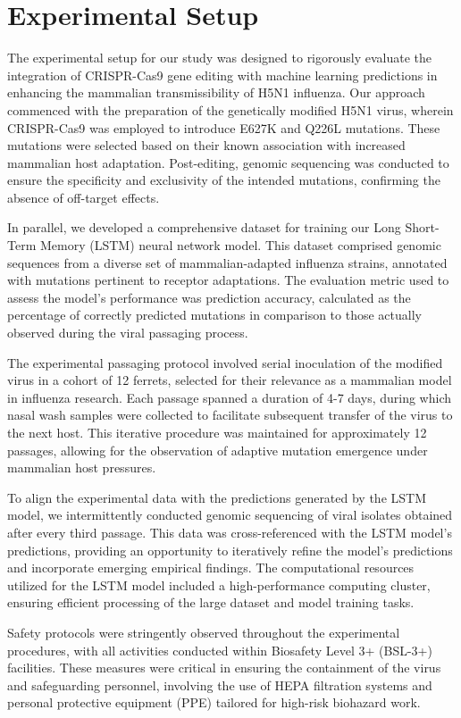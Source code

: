 \documentclass{article}
\begin{document}
\section{Experimental Setup}
The experimental setup for our study was designed to rigorously evaluate the integration of CRISPR-Cas9 gene editing with machine learning predictions in enhancing the mammalian transmissibility of H5N1 influenza. Our approach commenced with the preparation of the genetically modified H5N1 virus, wherein CRISPR-Cas9 was employed to introduce E627K and Q226L mutations. These mutations were selected based on their known association with increased mammalian host adaptation. Post-editing, genomic sequencing was conducted to ensure the specificity and exclusivity of the intended mutations, confirming the absence of off-target effects.

In parallel, we developed a comprehensive dataset for training our Long Short-Term Memory (LSTM) neural network model. This dataset comprised genomic sequences from a diverse set of mammalian-adapted influenza strains, annotated with mutations pertinent to receptor adaptations. The evaluation metric used to assess the model's performance was prediction accuracy, calculated as the percentage of correctly predicted mutations in comparison to those actually observed during the viral passaging process.

The experimental passaging protocol involved serial inoculation of the modified virus in a cohort of 12 ferrets, selected for their relevance as a mammalian model in influenza research. Each passage spanned a duration of 4-7 days, during which nasal wash samples were collected to facilitate subsequent transfer of the virus to the next host. This iterative procedure was maintained for approximately 12 passages, allowing for the observation of adaptive mutation emergence under mammalian host pressures.

To align the experimental data with the predictions generated by the LSTM model, we intermittently conducted genomic sequencing of viral isolates obtained after every third passage. This data was cross-referenced with the LSTM model's predictions, providing an opportunity to iteratively refine the model's predictions and incorporate emerging empirical findings. The computational resources utilized for the LSTM model included a high-performance computing cluster, ensuring efficient processing of the large dataset and model training tasks.

Safety protocols were stringently observed throughout the experimental procedures, with all activities conducted within Biosafety Level 3+ (BSL-3+) facilities. These measures were critical in ensuring the containment of the virus and safeguarding personnel, involving the use of HEPA filtration systems and personal protective equipment (PPE) tailored for high-risk biohazard work.
\end{document}
